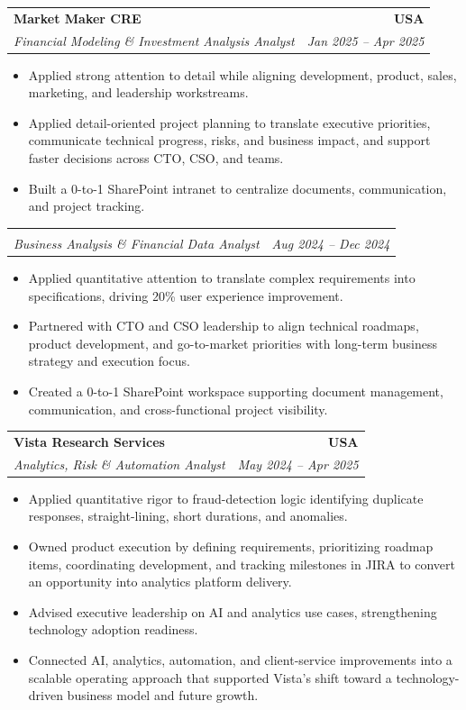 \documentclass[letterpaper,10pt]{article}
\makeatletter
\newcommand{\resumeItem}[1]{\item \small{#1}}
\newcommand{\resumeSubheading}[4]{
  \vspace{1pt}\item
    \begin{tabular*}{1.0\textwidth}[t]{l@{\extracolsep{\fill}}r}
      \textbf{#1} & \textbf{\small #2} \\
      \textit{\small #3} & \textit{\small #4} \\
    \end{tabular*}\vspace{-6pt}
}
\newcommand{\resumeItemListStart}{\begin{itemize}[leftmargin=0.15in, itemsep=1pt, topsep=3pt]}
\newcommand{\resumeItemListEnd}{\end{itemize}\vspace{-2pt}}
\makeatother
\begin{document}
\vspace{-2pt}

\resumeSubheading
{Market Maker CRE}{USA}
{Financial Modeling \& Investment Analysis Analyst}{Jan 2025 -- Apr 2025}
\resumeItemListStart
\resumeItem{Applied strong attention to detail while aligning development, product, sales, marketing, and leadership workstreams.}
\resumeItem{Applied detail-oriented project planning to translate executive priorities, communicate technical progress, risks, and business impact, and support faster decisions across CTO, CSO, and teams.}
\resumeItem{Built a 0-to-1 SharePoint intranet to centralize documents, communication, and project tracking.}
\resumeItemListEnd

\vspace{-2pt}

\resumeSubheading
{}{}
{Business Analysis \& Financial Data Analyst}{Aug 2024 -- Dec 2024}
\resumeItemListStart
\resumeItem{Applied quantitative attention to translate complex requirements into specifications, driving 20\% user experience improvement.}
\resumeItem{Partnered with CTO and CSO leadership to align technical roadmaps, product development, and go-to-market priorities with long-term business strategy and execution focus.}
\resumeItem{Created a 0-to-1 SharePoint workspace supporting document management, communication, and cross-functional project visibility.}
\resumeItemListEnd

\vspace{-2pt}

\resumeSubheading
{Vista Research Services}{USA}
{Analytics, Risk \& Automation Analyst}{May 2024 -- Apr 2025}
\resumeItemListStart
\resumeItem{Applied quantitative rigor to fraud-detection logic identifying duplicate responses, straight-lining, short durations, and anomalies.}
\resumeItem{Owned product execution by defining requirements, prioritizing roadmap items, coordinating development, and tracking milestones in JIRA to convert an opportunity into analytics platform delivery.}
\resumeItem{Advised executive leadership on AI and analytics use cases, strengthening technology adoption readiness.}
\resumeItem{Connected AI, analytics, automation, and client-service improvements into a scalable operating approach that supported Vista's shift toward a technology-driven business model and future growth.}
\resumeItemListEnd

\vspace{-2pt}
\end{document}
